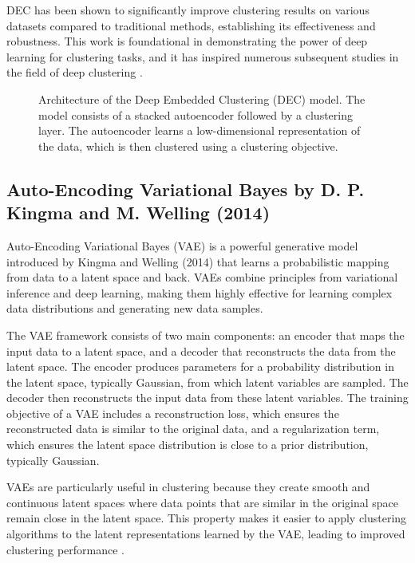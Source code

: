 DEC has been shown to significantly improve clustering results on various datasets compared to traditional methods, establishing its effectiveness and robustness. This work is foundational in demonstrating the power of deep learning for clustering tasks, and it has inspired numerous subsequent studies in the field of deep clustering \citep{Xie2016}.

\begin{figure}[h]
    \centering
    \caption{Architecture of the Deep Embedded Clustering (DEC) model. The model consists of a stacked autoencoder followed by a clustering layer. The autoencoder learns a low-dimensional representation of the data, which is then clustered using a clustering objective.}
    \label{fig:dec_architecture}
\end{figure}

\subsection{Auto-Encoding Variational Bayes by D. P. Kingma and M. Welling (2014)}

Auto-Encoding Variational Bayes (VAE) is a powerful generative model introduced by Kingma and Welling (2014) that learns a probabilistic mapping from data to a latent space and back. VAEs combine principles from variational inference and deep learning, making them highly effective for learning complex data distributions and generating new data samples.

The VAE framework consists of two main components: an encoder that maps the input data to a latent space, and a decoder that reconstructs the data from the latent space. The encoder produces parameters for a probability distribution in the latent space, typically Gaussian, from which latent variables are sampled. The decoder then reconstructs the input data from these latent variables. The training objective of a VAE includes a reconstruction loss, which ensures the reconstructed data is similar to the original data, and a regularization term, which ensures the latent space distribution is close to a prior distribution, typically Gaussian.

VAEs are particularly useful in clustering because they create smooth and continuous latent spaces where data points that are similar in the original space remain close in the latent space. This property makes it easier to apply clustering algorithms to the latent representations learned by the VAE, leading to improved clustering performance \citep{Kingma2014}.

